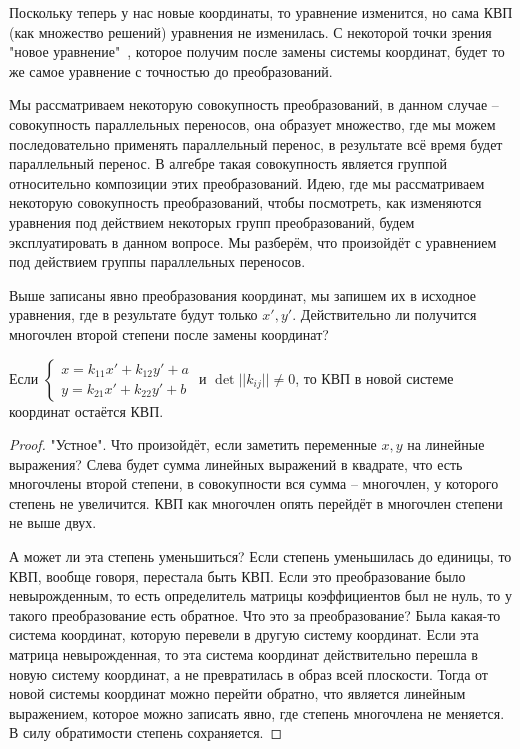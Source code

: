  Поскольку теперь у нас новые координаты, то уравнение изменится, но сама КВП (как множество решений) уравнения не изменилась.
 С некоторой точки зрения "новое уравнение"\ , которое получим после замены системы координат, будет то же самое уравнение с точностью до преобразований.

 Мы рассматриваем некоторую совокупность преобразований, в данном случае -- совокупность параллельных переносов, она образует множество, где мы можем последовательно применять параллельный перенос, в результате всё время будет параллельный перенос. 
 В алгебре такая совокупность является группой относительно композиции этих преобразований.
 Идею, где мы рассматриваем некоторую совокупность преобразований, чтобы посмотреть, как изменяются уравнения под действием некоторых групп преобразований, будем эксплуатировать в данном вопросе.
 Мы разберём, что произойдёт с уравнением под действием группы параллельных переносов.

 Выше записаны явно преобразования координат, мы запишем их в исходное уравнения, где в результате будут только $x', y'$.
 Действительно ли получится многочлен второй степени после замены координат? 

 \begin{Prop}
	 Если $\begin{cases}
		 x = k_{11}x' + k_{12}y' + a\\
		 y = k_{21}x' + k_{22}y' + b
	 \end{cases}$ и $ \det ||k_{ij}|| \neq 0$, то КВП в новой системе координат остаётся КВП.
 \end{Prop}

 \begin{proof}
	 "Устное". Что произойдёт, если заметить переменные $x, y$ на линейные выражения? Слева будет сумма линейных выражений в квадрате, что есть многочлены второй степени, в совокупности вся сумма -- многочлен, у которого степень не увеличится.
	КВП как многочлен опять перейдёт в многочлен степени не выше двух.

	А может ли эта степень уменьшиться? Если степень уменьшилась до единицы, то КВП, вообще говоря, перестала быть КВП. Если это преобразование было невырожденным, то есть определитель матрицы коэффициентов был не нуль, то у такого преобразование есть обратное.
	Что это за преобразование? Была какая-то система координат, которую перевели в другую систему координат. Если эта матрица невырожденная, то эта система координат действительно перешла в новую систему координат, а не превратилась в образ всей плоскости. 
	Тогда от новой системы координат можно перейти обратно, что является линейным выражением, которое можно записать явно, где степень многочлена не меняется.
	В силу обратимости степень сохраняется.
\end{proof}

